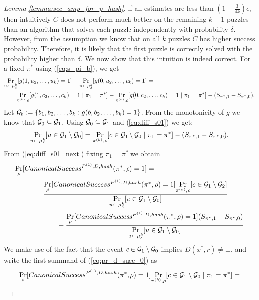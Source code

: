 \begin{proof}[Lemma \ref{lemma:sec_amp_for_p_hash}]
If all estimates are less than $(1-\frac{3}{4k})\epsilon$, then intuitively $C$
does not perform much better on the remaining $k-1$ puzzles than an algorithm that solves each puzzle independently with probability $\delta$.
However, from the assumption we know that on all $k$ puzzles $\widetilde{C}$ has higher success probability.
Therefore, it is likely that the first puzzle is correctly solved with the probability higher than $\delta$.
%
We now show that this intuition is indeed correct. For a fixed $\pi^*$ using (\ref{eq:s_pi_b}), we get
\begin{align}
\label{eq:diff_s01}
  &\underset{u \leftarrow \mu_{\delta}^k}{\Pr}[g(1, u_2, \dots, u_k)=1] - \underset{u \leftarrow \mu_{\delta}^k}{\Pr}[g(0, u_2, \dots, u_k)=1] = \notag\\
&\mbox\qquad  \underset{\pi^{(k)}, \rho}{\Pr}[g(1, c_2, \dots, c_k) =1 \mid \pi_1 = \pi^*] - \underset{\pi^{(k)}, \rho}{\Pr}[g(0, c_2, \dots, c_k) = 1 \mid \pi_1 = \pi^*] - (S_{\pi^*,1} - S_{\pi^*,0}).
\end{align}
Let $\mathcal{G}_{b} := \{ b_1, b_2, \dots, b_k : g(b, b_2, \dots, b_k) = 1 \}$.
From the monotonicity of $g$ we know that $\mathcal{G}_0 \subseteq \mathcal{G}_1$.
Using $\mathcal{G}_0 \subseteq \mathcal{G}_1$ and (\ref{eq:diff_s01}) we get:
\begin{align}
  \label{eq:diff_s01_next}
  \underset{u \leftarrow \mu_{\delta}^k}{\Pr}[u \in \mathcal{G}_1 \setminus \mathcal{G}_0] = \underset{\pi^{(k)}, \rho}{\Pr}[c \in \mathcal{G}_1 \setminus \mathcal{G}_0 \mid \pi_1 = \pi^*] - (S_{\pi^*,1} - S_{\pi^*,0}).
\end{align}
From (\ref{eq:diff_s01_next}) fixing $\pi_1 = \pi^*$ we obtain
\begin{align}
\label{eq:pr_d_succ_0}
&\underset{\rho}{\Pr}[CanonicalSuccess^{P^{(1)}, D, hash}(\pi^*, \rho) = 1] = \notag\\
&\mbox\qquad\qquad\frac{\underset{\rho}{\Pr}[CanonicalSuccess^{P^{(1)}, D, hash}(\pi^*, \rho) = 1] \underset{\pi^{(k)}, \rho}{\Pr}[c \in \mathcal{G}_1 \setminus \mathcal{G}_2]}
{\underset{u \leftarrow \mu_{\delta}^k}{\Pr}[u \in \mathcal{G}_1 \setminus \mathcal{G}_0]} \notag\\
&\mbox\qquad\qquad\qquad-\frac{\underset{\rho}{\Pr}[CanonicalSuccess^{P^{(1)}, D, hash}(\pi^*, \rho) = 1] (S_{\pi^*,1} - S_{\pi^*,0})}
{\underset{u \leftarrow \mu_{\delta}^k}{\Pr}[u \in \mathcal{G}_1 \setminus \mathcal{G}_0]}
\end{align}
We make use of the fact that the event $c \in \mathcal{G}_1 \setminus \mathcal{G}_0$ implies $D(x^*, r) \neq \bot$, and write the first summand of (\ref{eq:pr_d_succ_0}) as
\begin{align}
  &\underset{\rho}{\Pr}[CanonicalSuccess^{P^{(1)}, D, hash}(\pi^*,\rho) = 1] \underset{\pi^{(k)}, \rho}{\Pr}[c \in \cG_1 \setminus \cG_0 \mid \pi_1 = \pi^*] = \notag\\

\end{align}
\end{proof}
